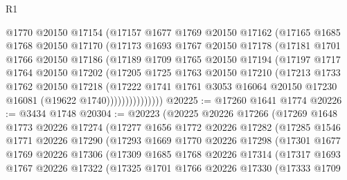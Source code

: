 \begin{lexlean}{R1}
\begin{coremodule}
              @1770
              @20150
              @17154
              (@17157
                @1677
                @1769
                @20150
                @17162
                (@17165
                  @1685
                  @1768
                  @20150
                  @17170
                  (@17173
                    @1693
                    @1767
                    @20150
                    @17178
                    (@17181
                      @1701
                      @1766
                      @20150
                      @17186
                      (@17189
                        @1709
                        @1765
                        @20150
                        @17194
                        (@17197
                          @1717
                          @1764
                          @20150
                          @17202
                          (@17205
                            @1725
                            @1763
                            @20150
                            @17210
                            (@17213
                              @1733
                              @1762
                              @20150
                              @17218
                              (@17222
                                @1741
                                @1761
                                @3053
                                @16064
                                @20150
                                @17230
                                @16081
                                (@19622 @1740)))))))))))))))
@20225 := @17260 @1641 @1774
@20226 := @3434 @1748
@20304 := @20223
    (@20225
      @20226
      @17266
      (@17269
        @1648
        @1773
        @20226
        @17274
        (@17277
          @1656
          @1772
          @20226
          @17282
          (@17285
            @1546
            @1771
            @20226
            @17290
            (@17293
              @1669
              @1770
              @20226
              @17298
              (@17301
                @1677
                @1769
                @20226
                @17306
                (@17309
                  @1685
                  @1768
                  @20226
                  @17314
                  (@17317
                    @1693
                    @1767
                    @20226
                    @17322
                    (@17325
                      @1701
                      @1766
                      @20226
                      @17330
                      (@17333
                        @1709

\end{coremodule}
\end{lexlean}
